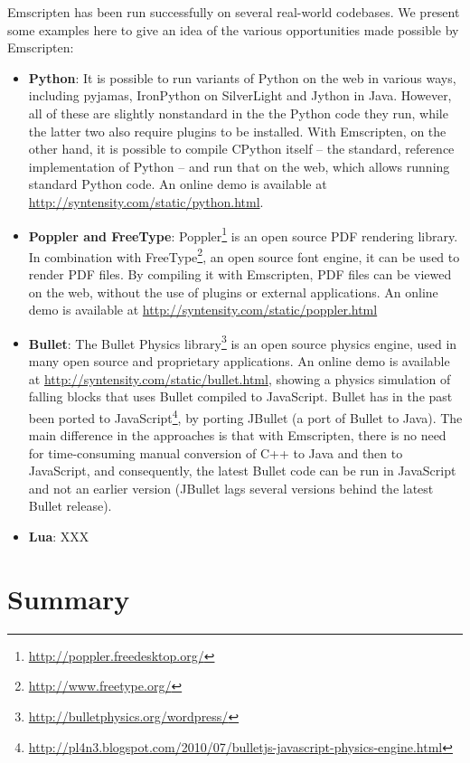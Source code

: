 \documentclass[11pt]{proc}
\begin{document}
Emscripten has been run successfully on several real-world codebases. We present
some examples here to give an idea of the various opportunities made possible
by Emscripten:
\begin{itemize}
\item \textbf{Python}: It is possible to run variants of Python on
the web in various ways, including pyjamas, IronPython on SilverLight and
Jython in Java. However, all of these are slightly nonstandard in the
the Python code they run, while the latter two also require plugins to be
installed. With Emscripten, on the other hand, it is possible to compile
CPython itself -- the standard, reference implementation of Python -- and
run that on the web, which allows running standard Python code. An online
demo is available at \url{http://syntensity.com/static/python.html}.
\item \textbf{Poppler and FreeType}: Poppler\footnote{\url{http://poppler.freedesktop.org/}} is an open source PDF
rendering library. In combination with FreeType\footnote{\url{http://www.freetype.org/}}, an open source font
engine, it can be used to render PDF files. By compiling it with Emscripten,
PDF files can be viewed on the web, without the use of plugins or external
applications. An online demo is available at \url{http://syntensity.com/static/poppler.html}
\item \textbf{Bullet}: The Bullet Physics library\footnote{\url{http://bulletphysics.org/wordpress/}} is
an open source physics engine, used in many open source and proprietary applications. An online
demo is available at \url{http://syntensity.com/static/bullet.html}, showing a physics
simulation of falling blocks that uses Bullet compiled to JavaScript. Bullet has in the
past been ported to JavaScript\footnote{\url{http://pl4n3.blogspot.com/2010/07/bulletjs-javascript-physics-engine.html}}, by porting JBullet (a port of Bullet to Java). The main difference in the approaches is that with Emscripten, there is no need for
time-consuming manual conversion of C++ to Java and then to JavaScript, and consequently,
the latest Bullet code can be run in JavaScript and not an earlier version (JBullet lags
several versions behind the latest Bullet release).
\item \textbf{Lua}: XXX
\end{itemize}

\section{Summary}
\end{document}
